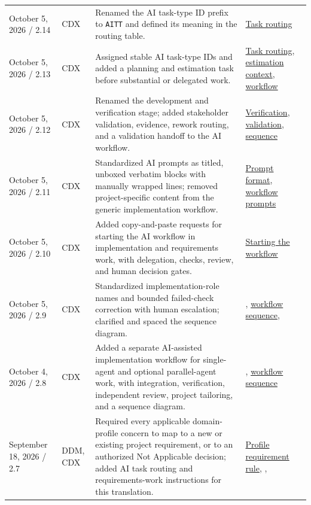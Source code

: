 \begin{tabularx}{\linewidth}{L{3.1cm}L{2.2cm}YL{2.0cm}}
October 5, 2026 / 2.14 & CDX & Renamed the AI task-type ID prefix to \texttt{AITT} and defined its meaning in the routing table. & \hyperref[Table:AISkills]{Task routing}\\
October 5, 2026 / 2.13 & CDX & Assigned stable AI task-type IDs and added a planning and estimation task before substantial or delegated work. & \hyperref[Table:AISkills]{Task routing}, \hyperref[Section:AIPlanningEstimateContext]{estimation context}, \hyperref[Chapter:AIImplementationWorkflow]{workflow}\\
October 5, 2026 / 2.12 & CDX & Renamed the development and verification stage; added stakeholder validation, evidence, rework routing, and a validation handoff to the AI workflow. & \hyperref[Section:AIImplementationVerification]{Veri\-fication}, \hyperref[Section:AIImplementationValidation]{validation}, \hyperref[Figure:AIImplementationSequence]{sequence}\\
October 5, 2026 / 2.11 & CDX & Standardized AI prompts as titled, unboxed verbatim blocks with manually wrapped lines; removed project-specific content from the generic implementation workflow. & \hyperref[Section:AIPromptFormatting]{Prompt format}, \hyperref[Section:AIImplementationStart]{workflow prompts}\\
October 5, 2026 / 2.10 & CDX & Added copy-and-paste requests for starting the AI workflow in implementation and requirements work, with delegation, checks, review, and human decision gates. & \hyperref[Section:AIImplementationStart]{Starting the workflow}\\
October 5, 2026 / 2.9 & CDX & Standardized implementation-role names and bounded failed-check correction with human escalation; clarified and spaced the sequence diagram. & , \hyperref[Figure:AIImplementationSequence]{workflow sequence}, \\
October 4, 2026 / 2.8 & CDX & Added a separate AI-assisted implementation workflow for single-agent and optional parallel-agent work, with integration, verification, independent review, project tailoring, and a sequence diagram. & , \hyperref[Figure:AIImplementationSequence]{workflow sequence}\\
September 18, 2026 / 2.7 & DDM, CDX & Required every applicable domain-profile concern to map to a new or existing project requirement, or to an authorized Not Applicable decision; added AI task routing and requirements-work instructions for this translation. & \hyperref[Section:DomainProfileRequirements]{Profile requirement rule}, , \\

\end{tabularx}
